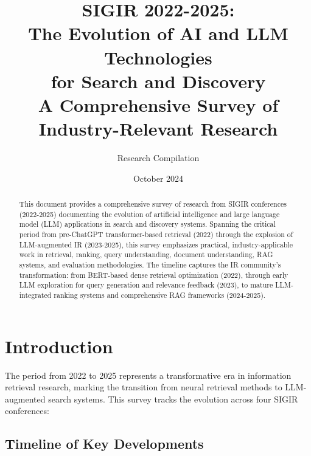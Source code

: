 \documentclass[11pt,letterpaper]{article}
\title{\textbf{SIGIR 2022-2025:\\The Evolution of AI and LLM Technologies\\for Search and Discovery}\\
\large A Comprehensive Survey of Industry-Relevant Research}
\author{Research Compilation}
\date{October 2024}
\begin{document}
\maketitle

\begin{abstract}
This document provides a comprehensive survey of research from SIGIR conferences (2022-2025) documenting the evolution of artificial intelligence and large language model (LLM) applications in search and discovery systems. Spanning the critical period from pre-ChatGPT transformer-based retrieval (2022) through the explosion of LLM-augmented IR (2023-2025), this survey emphasizes practical, industry-applicable work in retrieval, ranking, query understanding, document understanding, RAG systems, and evaluation methodologies. The timeline captures the IR community's transformation: from BERT-based dense retrieval optimization (2022), through early LLM exploration for query generation and relevance feedback (2023), to mature LLM-integrated ranking systems and comprehensive RAG frameworks (2024-2025).
\end{abstract}

\tableofcontents
\newpage

\section{Introduction}

The period from 2022 to 2025 represents a transformative era in information retrieval research, marking the transition from neural retrieval methods to LLM-augmented search systems. This survey tracks the evolution across four SIGIR conferences:

\subsection{Timeline of Key Developments}
\end{document}
